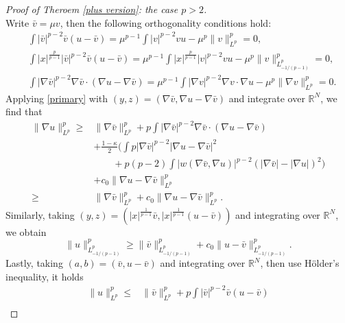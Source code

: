\documentclass[11pt]{article}
\newcommand{\R}{\mathbb{R}}
\numberwithin{equation}{section}
\begin{document}
\begin{proof}[Proof of Theroem \ref{plus version}: the case $p>2$]
\begin{equation*}
    \end{equation*}
    Write $\bar v = \mu v$, then the following orthogonality conditions hold:
    \begin{equation}\label{orth-111}
        \begin{aligned}
            & \int |\bar v|^{p-2}\bar v(u-\bar v) = \mu^{p-1}\int |v|^{p-2}vu - \mu^p \|v\|_{L^p}^p = 0, \\
            & \int |x|^{\frac{p}{p-1}}|\bar v|^{p-2}\bar{v}(u-\bar v) = \mu^{p-1}\int |x|^{\frac{p}{p-1}}|v|^{p-2}vu - \mu^p \|v\|_{L^p_{-1/(p-1)}}^p = 0,\\
            & \int |\nabla \bar v|^{p-2}\nabla\bar v\cdot(\nabla u-\nabla \bar v) = \mu^{p-1}\int |\nabla v|^{p-2}\nabla v\cdot\nabla u - \mu^p \|\nabla v\|_{L^p}^p = 0.
        \end{aligned}
    \end{equation}
    Applying \eqref{primary} with $(y,z)=(\nabla \bar v,\nabla u-\nabla \bar v)$ and integrate over $\R^N$, we find that
    \begin{equation}\label{111}
        \begin{aligned}
            \|\nabla u\|_{L^p}^p \ge{}& \|\nabla \bar v\|_{L^p}^p + p \int |\nabla \bar v|^{p-2}\nabla \bar v\cdot(\nabla u-\nabla \bar v) \\
            & + \frac{1-\kappa}{2}\bigg(\int p|\nabla \bar v|^{p-2}|\nabla u-\nabla \bar v|^2 \\
            & \qquad + p(p-2) \int |w(\nabla\bar v,\nabla u)|^{p-2}(|\nabla\bar v|-|\nabla u|)^2 \bigg) \\
            & + c_0 \|\nabla u-\nabla\bar v\|_{L^p}^p \\
            \ge{}& \|\nabla\bar v\|_{L^p}^p + c_0 \|\nabla u-\nabla\bar v\|_{L^p}^p.
        \end{aligned}
    \end{equation}
    Similarly, taking $(y,z)=(|x|^{\frac{1}{p-1}}\bar v, |x|^{\frac{1}{p-1}}(u-\bar v))$ and integrating over $\R^N$, we obtain
    \begin{equation}\label{222}
        \|u\|_{L^p_{-1/(p-1)}}^p \ge \|\bar v\|_{L^p_{-1/(p-1)}}^p + c_0 \|u-\bar v\|_{L^p_{-1/(p-1)}}^p.
    \end{equation}
    Lastly, taking $(a,b)=(\bar v,u-\bar v)$ and integrating over $\R^N$, then use H\"{o}lder's inequality, it holds
    \begin{equation}\label{333}
        \begin{aligned}
            \|u\|_{L^p}^p \le{}& \|\bar v\|_{L^p}^p + p \int |\bar v|^{p-2}\bar v(u-\bar v) \\

\end{aligned}
\end{equation}
\end{proof}
\end{document}
